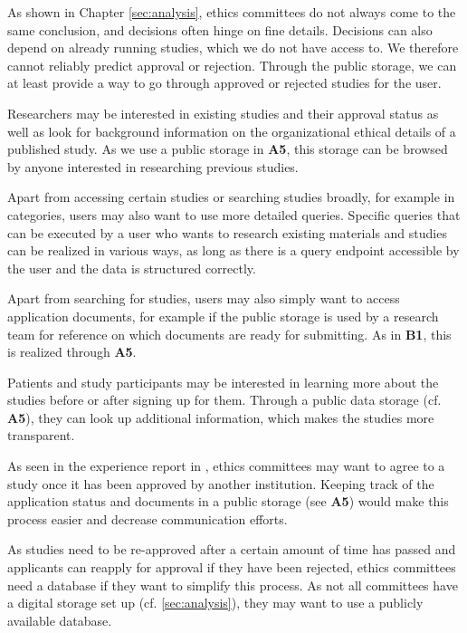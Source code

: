 \documentclass[10pt]{article}
\begin{document}
\begin{A}
      \item As shown in Chapter \ref{sec:analysis}, ethics committees do not always come to the same conclusion, and decisions often hinge on fine details. Decisions can also depend on already running studies, which we do not have access to. We therefore cannot reliably predict approval or rejection. Through the public storage, we can at least provide a way to go through approved or rejected  studies for the user.
    \end{A}
    
    \begin{B}
    	\item Researchers may be interested in existing studies and their approval status as well as look for background information on the organizational ethical details of a published study. As we use a public storage in \textbf{A5}, this storage can be browsed by anyone interested in researching previous studies.
    	\item Apart from accessing certain studies or searching studies broadly, for example in categories, users may also want to use more detailed queries. Specific queries that can be executed by a user who wants to research existing materials and studies can be realized in various ways, as long as there is a query endpoint accessible by the user and the data is structured correctly.
    	\item Apart from searching for studies, users may also simply want to access application documents, for example if the public storage is used by a research team for reference on which documents are ready for submitting. As in \textbf{B1}, this is realized through \textbf{A5}.    
    \end{B}
    
    \begin{C}
        \item  Patients and study participants may be interested in learning more about the studies before or after signing up for them. Through a public data storage (cf. \textbf{A5}), they can look up additional information, which makes the studies more transparent.
    \end{C}
    
    \begin{D}
        \item As seen in the experience report in \cite{rephospital}, ethics committees may want to agree to a study once it has been approved by another institution. Keeping track of the application status and documents in a public storage (see \textbf{A5}) would make this process easier and decrease communication efforts.
        \item As studies need to be re-approved after a certain amount of time has passed and applicants can reapply for approval if they have been rejected, ethics committees need a database if they want to simplify this process. As not all committees have a digital storage set up (cf. \ref{sec:analysis}), they may want to use a publicly available database.
    \end{D}
\end{document}
